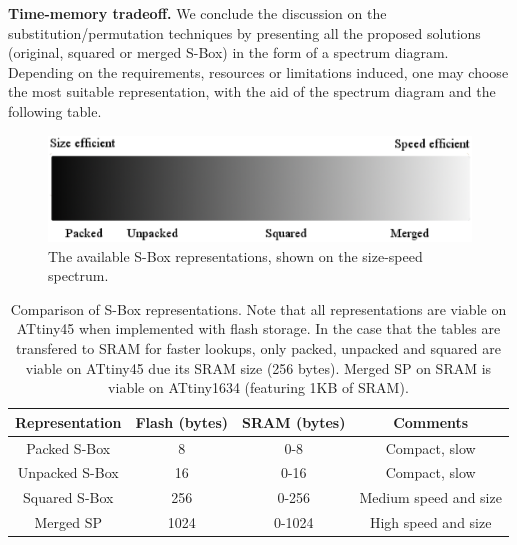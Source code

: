 \documentclass[11pt]{article}
\begin{document}
\textbf{Time-memory tradeoff.} We conclude the discussion on the substitution/permutation techniques by presenting all the proposed solutions (original, squared or merged S-Box) in the form of a spectrum diagram. Depending on the requirements, resources or limitations induced, one may choose the most suitable representation, with the aid of the spectrum diagram and the following table.\\
\begin{figure}[h]
\centering
\includegraphics[scale=0.3]{spectrum}
\caption{\footnotesize The available S-Box representations, shown on the size-speed spectrum.}
\end{figure}
\begin{table}[h]
\footnotesize
\centering
\begin{tabular}{| c | c  | c | c | }
\hline
  Representation & Flash (bytes) & SRAM (bytes) & Comments  \\
\hline
  Packed S-Box & 8  & 0-8 & Compact, slow   \\
 \hline
  Unpacked S-Box & 16  & 0-16 & Compact, slow   \\
\hline
  Squared S-Box & 256  & 0-256 & Medium speed and size   \\
 \hline
  Merged SP & 1024  & 0-1024 & High speed and size  \\
 

\hline
\end{tabular}
\caption{\footnotesize Comparison of S-Box representations. Note that all representations are viable on ATtiny45 when implemented with flash storage. In the case that the tables are transfered to SRAM for faster lookups, only packed, unpacked and squared are viable on ATtiny45 due its SRAM size (256 bytes). Merged SP on SRAM is viable on ATtiny1634 (featuring 1KB of SRAM). }
\end{table}
\end{document}
